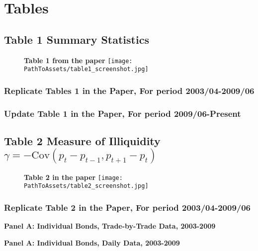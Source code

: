 \documentclass{article}
\newcommand*{\PathToAssets}{../assets}%
\newcommand*{\PathToOutput}{../output/}%
\begin{document}
\section{Tables}

\subsection{Table 1 Summary Statistics}

\begin{figure}[htbp]
\centering
\textbf{\large Table 1 from the paper}
\texttt{[image: \\PathToAssets/table1\_screenshot.jpg]}
\end{figure}

\subsubsection{Replicate Tables 1 in the Paper, For period 2003/04-2009/06}
\doublespacing

\subsubsection{Update Table 1 in the Paper, For period 2009/06-Present}
\doublespacing


\subsection{Table 2 Measure of Illiquidity $ \gamma = -\text{Cov}(p_t - p_{t-1}, p_{t+1} - p_t) $ }


\begin{figure}[h]
\centering
\textbf{\large Table 2 in the paper}
\texttt{[image: \\PathToAssets/table2\_screenshot.jpg]}
\end{figure}


\subsubsection{Replicate Table 2 in the Paper, For period 2003/04-2009/06}
\doublespacing
\begin{table}[h]
\centering
\textbf{\large Panel A: Individual Bonds, Trade-by-Trade Data, 2003-2009}

\label{table:table2_panelA_trade_by_trade_paper}
\end{table}

\begin{table}[h]
\centering
\textbf{\large Panel A: Individual Bonds, Daily Data, 2003-2009}

\label{table:table2_panelA_daily_paper}
\end{table}
\end{document}
